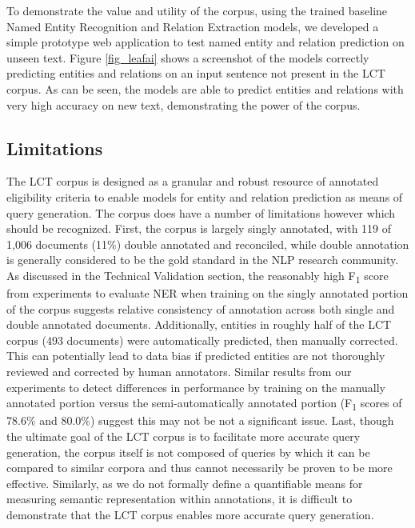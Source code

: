 \documentclass[../main.tex]{subfiles}
\begin{document}
\noindent To demonstrate the value and utility of the corpus, using the trained baseline Named Entity Recognition and Relation Extraction models, we developed a simple prototype web application to test named entity and relation prediction on unseen text. Figure \ref{fig_leafai} shows a screenshot of the models correctly predicting entities and relations on an input sentence not present in the LCT corpus. As can be seen, the models are able to predict entities and relations with very high accuracy on new text, demonstrating the power of the corpus. 

\subsection*{Limitations}
\noindent The LCT corpus is designed as a granular and robust resource of annotated eligibility criteria to enable models for entity and relation prediction as means of query generation. The corpus does have a number of limitations however which should be recognized. First, the corpus is largely singly annotated, with 119 of 1,006 documents (11\%) double annotated and reconciled, while double annotation is generally considered to be the gold standard in the NLP research community. As discussed in the Technical Validation section, the reasonably high F\textsubscript{1} score from experiments to evaluate NER when training on the singly annotated portion of the corpus suggests relative consistency of annotation across both single and double annotated documents. Additionally, entities in roughly half of the LCT corpus (493 documents) were automatically predicted, then manually corrected. This can potentially lead to data bias if predicted entities are not thoroughly reviewed and corrected by human annotators. Similar results from our experiments to detect differences in performance by training on the manually annotated portion versus the semi-automatically annotated portion (F\textsubscript{1} scores of 78.6\% and 80.0\%) suggest this may not be not a significant issue. Last, though the ultimate goal of the LCT corpus is to facilitate more accurate query generation, the corpus itself is not composed of queries by which it can be compared to similar corpora and thus cannot necessarily be proven to be more effective. Similarly, as we do not formally define a quantifiable means for measuring semantic representation within annotations, it is difficult to demonstrate that the LCT corpus enables more accurate query generation. \\
\end{document}
